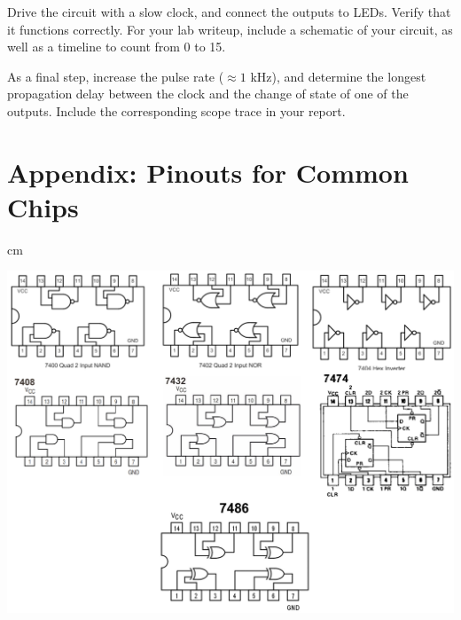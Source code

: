 \documentclass[12pt]{article}
\begin{document}
Drive the circuit with a slow clock, and connect the outputs to LEDs.  Verify that it functions correctly.  For your lab writeup, include a schematic 
of your circuit, as well as a timeline to count from 0 to 15.

As a final step, increase the pulse rate ($\approx 1$ kHz), and determine the longest propagation delay between the clock and 
the change of state of one of the outputs.  Include the corresponding scope trace in your report.

\section*{Appendix:  Pinouts for Common Chips}

 cm

\centerline{\includegraphics[width=6in]{figs/pinouts.png}}
\end{document}
